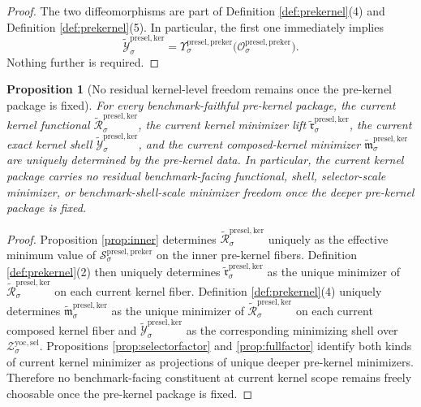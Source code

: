 \documentclass[11pt]{article}
\newcommand{\YoctoSelectorShell}[1]{\mathcal Z_{#1}^{\mathrm{yoc,sel}}}
\newcommand{\PreKernelProj}[1]{\Upsilon_{#1}^{\mathrm{presel,preker}}}
\newcommand{\PreKernelFunctional}[1]{\mathscr S_{#1}^{\mathrm{presel,preker}}}
\newcommand{\PreKernelShell}[1]{\mathcal O_{#1}^{\mathrm{presel,preker}}}
\newcommand{\InducedKernelFunctional}[1]{\widetilde{\mathscr R}_{#1}^{\mathrm{presel,ker}}}
\newcommand{\InducedKernelMinLift}[1]{\widetilde{\mathfrak r}_{#1}^{\mathrm{presel,ker}}}
\newcommand{\InducedKernelComposedMin}[1]{\widetilde{\mathfrak m}_{#1}^{\mathrm{presel,ker}}}
\newcommand{\InducedKernelShell}[1]{\widetilde{\mathcal Y}_{#1}^{\mathrm{presel,ker}}}
\newtheorem{proposition}{Proposition}
\begin{document}
\begin{proof}
The two diffeomorphisms are part of Definition \ref{def:prekernel}(4) and Definition \ref{def:prekernel}(5). In particular, the first one immediately implies
\[
\InducedKernelShell{\sigma}
=
\PreKernelProj{\sigma}\bigl(\PreKernelShell{\sigma}\bigr).
\]
Nothing further is required.
\end{proof}

\begin{proposition}[No residual kernel-level freedom remains once the pre-kernel package is fixed]
\label{prop:nofreedom}
For every benchmark-faithful pre-kernel package, the current kernel functional \(\InducedKernelFunctional{\sigma}\), the current kernel minimizer lift \(\InducedKernelMinLift{\sigma}\), the current exact kernel shell \(\InducedKernelShell{\sigma}\), and the current composed-kernel minimizer \(\InducedKernelComposedMin{\sigma}\) are uniquely determined by the pre-kernel data. In particular, the current kernel package carries no residual benchmark-facing functional, shell, selector-scale minimizer, or benchmark-shell-scale minimizer freedom once the deeper pre-kernel package is fixed.
\end{proposition}

\begin{proof}
Proposition \ref{prop:inner} determines \(\InducedKernelFunctional{\sigma}\) uniquely as the effective minimum value of \(\PreKernelFunctional{\sigma}\) on the inner pre-kernel fibers. Definition \ref{def:prekernel}(2) then uniquely determines \(\InducedKernelMinLift{\sigma}\) as the unique minimizer of \(\InducedKernelFunctional{\sigma}\) on each current kernel fiber. Definition \ref{def:prekernel}(4) uniquely determines \(\InducedKernelComposedMin{\sigma}\) as the unique minimizer of \(\InducedKernelFunctional{\sigma}\) on each current composed kernel fiber and \(\InducedKernelShell{\sigma}\) as the corresponding minimizing shell over \(\YoctoSelectorShell{\sigma}\). Propositions \ref{prop:selectorfactor} and \ref{prop:fullfactor} identify both kinds of current kernel minimizer as projections of unique deeper pre-kernel minimizers. Therefore no benchmark-facing constituent at current kernel scope remains freely choosable once the pre-kernel package is fixed.
\end{proof}
\end{document}
